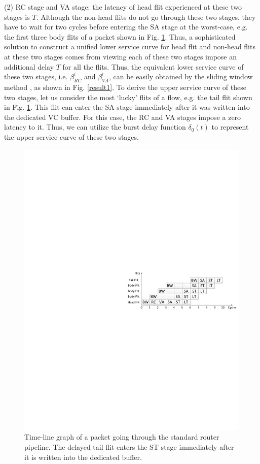 \documentclass[preprint]{elsarticle}
\begin{document}
(2) RC stage and VA stage: the latency of head flit experienced at these two stages is $T$. Although the non-head flits do not go through these two stages, they have to wait for two cycles before entering the SA stage at the worst-case, e.g. the first three body flits of a packet shown in Fig. \ref{pipeline}. Thus, a sophisticated solution to construct a unified lower service curve for head flit and non-head flits at these two stages comes from viewing each of these two stages impose an additional delay $T$ for all the flits. Thus, the equivalent lower service curve of these two stages, i.e. $\beta^l_{RC}$ and $\beta^l_{VA}$, can be easily obtained by the sliding window method \cite{1253607}, as shown in Fig. \ref{result1}. To derive the upper service curve of these two stages, let us consider the most `lucky' flits of a flow, e.g. the tail flit shown in Fig. \ref{pipeline}. This flit can enter the SA stage immediately after it was written into the dedicated VC buffer. For this case, the RC and VA stages impose a zero latency to it. Thus, we can utilize the burst delay function $\delta_0(t)$ to represent the upper service curve of these two stages.
\begin{figure}
  \centering
  \includegraphics[scale=0.35]{figures/Pipeline.pdf}
  \caption{Time-line graph of a packet going through the standard router pipeline. The delayed tail flit enters the ST stage immediately after it is written into the dedicated buffer.}\label{pipeline}
\end{figure}
\end{document}
